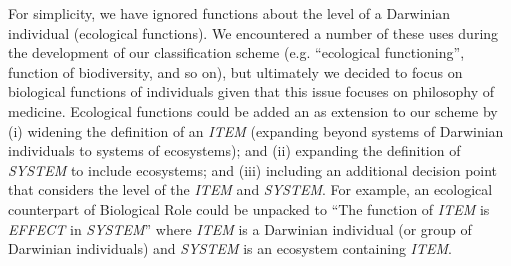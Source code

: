 \documentclass{article}
\begin{document}
For simplicity, we have ignored functions about the level of a Darwinian individual (ecological functions).
We encountered a number of these uses during the development of our classification scheme (e.g. ``ecological functioning'', function of biodiversity, and so on), but ultimately we decided to focus on biological functions of individuals given that this issue focuses on philosophy of medicine.
Ecological functions could be added an as extension to our scheme by (i) widening the definition of an \emph{ITEM} (expanding beyond systems of Darwinian individuals to systems of ecosystems); and (ii) expanding the definition of \emph{SYSTEM} to include ecosystems; and (iii) including an additional decision point that considers the level of the \emph{ITEM} and \emph{SYSTEM}.
For example, an ecological counterpart of Biological Role could be unpacked to ``The function of \emph{ITEM} is \emph{EFFECT} in \emph{SYSTEM}'' where \emph{ITEM} is a Darwinian individual (or group of Darwinian individuals) and \emph{SYSTEM} is an ecosystem containing \emph{ITEM}.
\end{document}
